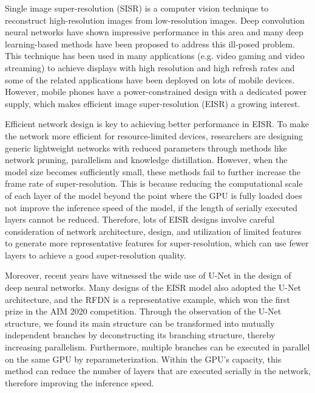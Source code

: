 \documentclass[10pt,twocolumn,letterpaper]{article}
\begin{document}
Single image super-resolution (SISR) is a computer vision technique to reconstruct high-resolution images from low-resolution images. Deep convolution neural networks have shown impressive performance in this area and many deep learning-based methods have been proposed to address this ill-posed problem.
This technique has been used in many applications (e.g. video gaming\cite{10.1145/2751496.2751502} and video streaming\cite{kimNeuralEnhancedLiveStreaming2020,yeoNeuralAdaptiveContentaware2018,maoNeuralAdaptiveVideo2017}) to achieve displays with high resolution and high refresh rates and some of the related applications have been deployed on lots of mobile devices\cite{yeoNEMOEnablingNeuralenhanced2020,mehtaEVRNetEfficientVideo2021}.
However, mobile phones have a power-constrained design with a dedicated power supply, which makes efficient image super-resolution (EISR) a growing interest.

Efficient network design is key to achieving better performance in EISR.
To make the network more efficient for resource-limited devices, researchers are designing generic lightweight networks with reduced parameters through methods like network pruning\cite{liuSplitSREndtoEndApproach2021,leeMobiSREfficientOnDevice2019,fang2023depgraph}, parallelism\cite{sandlerMobileNetV2InvertedResiduals2019,howardMobileNetsEfficientConvolutional2017,liuSplitSREndtoEndApproach2021,kongClassSRGeneralFramework2021} and knowledge distillation\cite{liu2020residual,khaniRealTimeVideoInference2021,taoCompressionGenerativePretrained2022,zhangDataFreeKnowledgeDistillation2021}.
However, when the model size becomes sufficiently small, these methods fail to further increase the frame rate of super-resolution. This is because reducing the computational scale of each layer of the model beyond the point where the GPU is fully loaded does not improve the inference speed of the model, if the length of serially executed layers cannot be reduced.
Therefore, lots of EISR designs\cite{liNTIRE2022Challenge2022,duFastMemoryEfficientNetwork2022,mehtaEVRNetEfficientVideo2021} involve careful consideration of network architecture, design, and utilization of limited features to generate more representative features for super-resolution, which can use fewer layers to achieve a good super-resolution quality.

Moreover, recent years have witnessed the wide use of U-Net\cite{ronnebergerUNetConvolutionalNetworks2015} in the design of deep neural networks. 
Many designs of the EISR model also adopted the U-Net architecture, and the RFDN\cite{liu2020residual} is a representative example, which won the first prize in the AIM 2020 competition. 
Through the observation of the U-Net structure, we found its main structure can be transformed into mutually independent branches by deconstructing its branching structure, thereby increasing parallelism. 
Furthermore, multiple branches can be executed in parallel on the same GPU by reparameterization. 
Within the GPU's capacity, this method can reduce the number of layers that are executed serially in the network, therefore improving the inference speed.
\end{document}
